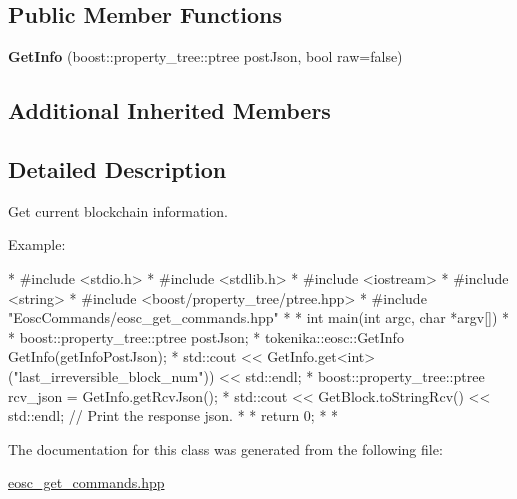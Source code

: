 \subsection*{Public Member Functions}
\begin{DoxyCompactItemize}
\item 
\mbox{\label{classtokenika_1_1eosc_1_1_get_info_a3b219ff2f0036acbecf97922e28c3793}} 
{\bfseries Get\+Info} (boost\+::property\+\_\+tree\+::ptree post\+Json, bool raw=false)
\end{DoxyCompactItemize}
\subsection*{Additional Inherited Members}


\subsection{Detailed Description}
Get current blockchain information. 

Example\+:

\begin{DoxyVerb}* #include <stdio.h>
* #include <stdlib.h>
* #include <iostream>
* #include <string>
* #include <boost/property_tree/ptree.hpp>
* #include "EoscCommands/eosc_get_commands.hpp"
* 
* int main(int argc, char *argv[])
* {
* boost::property_tree::ptree postJson;
* tokenika::eosc::GetInfo GetInfo(getInfoPostJson);
* std::cout << GetInfo.get<int>("last_irreversible_block_num")) << std::endl;
* boost::property_tree::ptree rcv_json = GetInfo.getRcvJson();
* std::cout << GetBlock.toStringRcv() << std::endl; // Print the response json.
* 
* return 0;
* }
* \end{DoxyVerb}
 

The documentation for this class was generated from the following file\+:\begin{DoxyCompactItemize}
\item 
\hyperlink{eosc__get__commands_8hpp}{eosc\+\_\+get\+\_\+commands.\+hpp}\end{DoxyCompactItemize}
